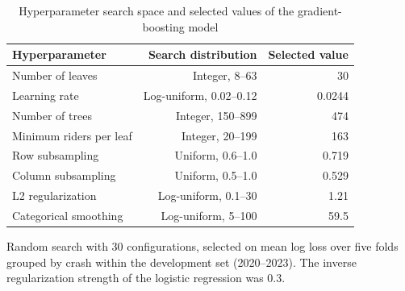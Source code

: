 \begin{table}[tp]
\centering\small
\caption{Hyperparameter search space and selected values of the gradient-boosting model}\label{tab:tables1}
\begin{threeparttable}
\begin{tabular}{lrr}
\toprule
Hyperparameter & Search distribution & Selected value \\
\midrule
Number of leaves & Integer, 8–63 & 30 \\
Learning rate & Log-uniform, 0.02–0.12 & 0.0244 \\
Number of trees & Integer, 150–899 & 474 \\
Minimum riders per leaf & Integer, 20–199 & 163 \\
Row subsampling & Uniform, 0.6–1.0 & 0.719 \\
Column subsampling & Uniform, 0.5–1.0 & 0.529 \\
L2 regularization & Log-uniform, 0.1–30 & 1.21 \\
Categorical smoothing & Log-uniform, 5–100 & 59.5 \\
\bottomrule
\end{tabular}
\begin{tablenotes}[flushleft]\footnotesize
\item Random search with 30 configurations, selected on mean log loss over five folds grouped by crash within the development set (2020–2023). The inverse regularization strength of the logistic regression was 0.3.
\end{tablenotes}
\end{threeparttable}
\end{table}
